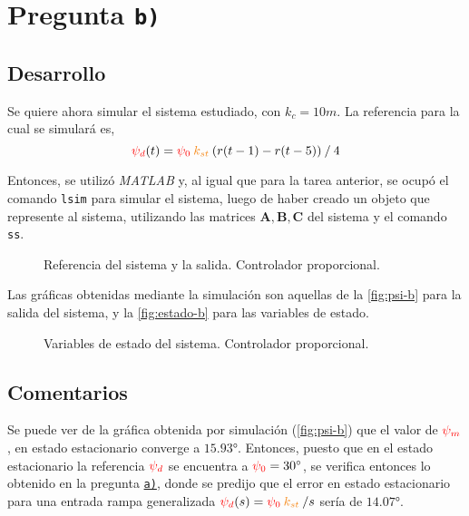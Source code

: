 \section{Pregunta \texttt{b)}}\label{pregunta-b}

\subsection{Desarrollo}

Se quiere ahora simular el sistema estudiado, con $k_{c} = 10\unit{m}$.
La referencia para la cual se simulará es,
\begin{equation}
  \rojo{\psi_{d}}(t) = \rojo{\psi_{0}}\nara{k_{st}}\left(r(t-1) - r(t-5)\right) \mathbin{/} 4
  \label{eq:referencia}
\end{equation}

Entonces, se utilizó \textit{MATLAB} y, al igual que para la tarea anterior,
se ocupó el comando \verb|lsim| para simular el sistema, luego de haber
creado un objeto que represente al sistema, utilizando las matrices
$\mathbf{A}, \mathbf{B}, \mathbf{C}$ del sistema y el comando \verb|ss|.

\begin{figure}[ht]
  \centering
  
  \caption{Referencia del sistema y la salida. Controlador proporcional.}
  \label{fig:psi-b}
\end{figure}

Las gráficas obtenidas mediante la simulación son aquellas de la \autoref{fig:psi-b} para
la salida del sistema, y la \autoref{fig:estado-b} para las variables de estado.

\begin{figure}[ht]
  \centering
  
  \caption{Variables de estado del sistema. Controlador proporcional.}
  \label{fig:estado-b}
\end{figure}

\subsection{Comentarios}

Se puede ver de la gráfica obtenida por simulación (\autoref{fig:psi-b}) que el
valor de $\mathbin{\color{red}\psi_{m}}$, en estado estacionario converge a $\ang{15.93}$.
Entonces, puesto que en el estado estacionario la referencia $\mathbin{\color{red}\psi_{d}}$
se encuentra a $\mathbin{\color{red}\psi_{0}} = \ang{30}$, se verifica entonces lo obtenido en
la pregunta \hyperref[pregunta-a]{\texttt{a)}}, donde se predijo que el error en
estado estacionario para una entrada rampa generalizada
$\rojo{\psi_{d}}(s) = \rojo{\psi_{0}}\nara{k_{st}}\mathbin{/}s$ sería de $\ang{14.07}$.

